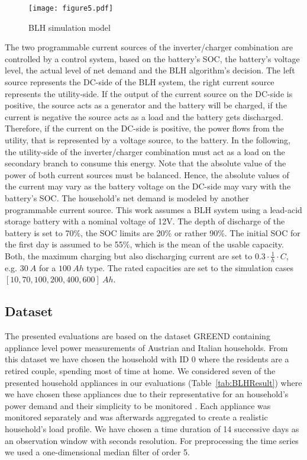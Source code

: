 \documentclass{article}
\begin{document}
\begin{figure}[h!]
	\centering
	\texttt{[image: figure5.pdf]}
	\caption{\ac{BLH} simulation model}
	\label{blh_simulation_model}
\end{figure}

The two programmable current sources of the inverter/charger combination are controlled by a control system, based on the battery's \ac{SOC}, the battery's voltage level, the actual level of net demand and the \ac{BLH} algorithm's decision. The left source represents the DC-side of the \ac{BLH} system, the right current source represents the utility-side. If the output of the current source on the DC-side is positive, the source acts as a generator and the battery will be charged, if the current is negative
the source acts as a load and the battery gets discharged. Therefore, if the current on the DC-side is positive, the power flows from the utility, that is represented by a voltage source, to the battery. In the following, the utility-side of the inverter/charger combination must act as a load on the secondary branch to consume this energy. Note that the absolute value of the power of both current sources must be balanced. Hence, the absolute values of the current may vary as the battery voltage on the DC-side may vary with the battery's \ac{SOC}. The household's net demand is modeled by another programmable current source.
This work assumes a \ac{BLH} system using a lead-acid storage battery with a nominal voltage of 12\:V. The depth of discharge of the battery is set to 70\%, the \ac{SOC} limits are 20\% or rather 90\%. The initial \ac{SOC} for the first day is assumed to be 55\%, which is the mean of the usable capacity. Both, the maximum charging but also discharging current are set to $0.3\cdot \frac{1}{h}\cdot C$, e.g. $30\:A$ for a $100\:Ah$ type. The rated capacities are set to the simulation cases $[10, 70, 100, 200, 400, 600] \: Ah$.
\subsection{Dataset}
The presented evaluations are based on the dataset \ac{GREEND} \cite{Andrea2014} containing appliance level power measurements of Austrian and Italian households. 
From this dataset we have chosen the household with ID 0 where the residents are a retired couple, spending most of time at home.
We considered seven of the presented household appliances in our evaluations (Table~\ref{tab:BLHResult}) where we have chosen these appliances due to their representative for an household's power demand and their simplicity to be monitored \cite{Carlson2013132}.
Each appliance was monitored separately and was afterwards aggregated to create a realistic household's load profile.
We have chosen a time duration of 14 successive days as an observation window with seconds resolution. 
For preprocessing the time series we used a one-dimensional median filter of order 5.
\end{document}
